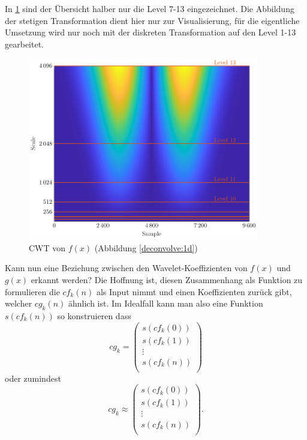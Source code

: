 In \ref{deconvolve:y1_cwt} sind der Übersicht halber nur die Level 7-13 eingezeichnet. 
Die Abbildung der stetigen Transformation dient hier nur zur Visualisierung, für die eigentliche Umsetzung wird nur noch mit der diskreten Transformation auf den Level 1-13 gearbeitet.

\begin{figure}[h]
\centering
\includegraphics[width=0.9\textwidth]{./papers/deconvolve/pictures/y1_cwt.pdf}
\caption{CWT von $f(x)$ (Abbildung \ref{deconvolve:1d})\label{deconvolve:y1_cwt}}
\end{figure}

Kann nun eine Beziehung zwischen den Wavelet-Koeffizienten von $f(x)$ und $g(x)$ erkannt werden?
Die Hoffnung ist, diesen Zusammenhang als Funktion zu formulieren die $cf_k(n)$ als Input nimmt und einen Koeffizienten zurück gibt, welcher $cg_k(n)$ ähnlich ist.
Im Idealfall kann man also eine Funktion $s(cf_k(n))$ so konstruieren dass
$$cg_k = \left(\begin{array}{c}
	s(cf_k(0))\\
	s(cf_k(1))\\
	\vdots\\
	s(cf_k(n))\\
\end{array} \right)$$
oder zumindest
$$cg_k \approx \left(\begin{array}{c}
	s(cf_k(0))\\
	s(cf_k(1))\\
	\vdots\\
	s(cf_k(n))\\
\end{array} \right).$$

